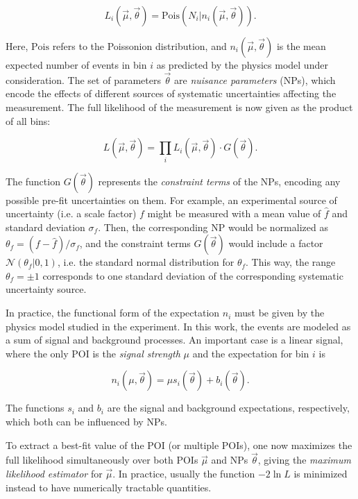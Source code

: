 \begin{equation}
    L_i (\vec{\mu}, \vec{\theta}) = \mathrm{Pois} \left(N_i | n_i (\vec{\mu}, \vec{\theta}) \right).
\end{equation}

Here, $\mathrm{Pois}$ refers to the Poissonion distribution, and $n_i (\vec{\mu}, \vec{\theta})$ is the mean expected number of events in bin $i$ as predicted by the physics model under consideration. The set of parameters $\vec{\theta}$ are \textit{nuisance parameters} (NPs), which encode the effects of different sources of systematic uncertainties affecting the measurement. The full likelihood of the measurement is now given as the product of all bins:

\begin{equation}
    L (\vec{\mu}, \vec{\theta}) = \prod_i L_i (\vec{\mu}, \vec{\theta}) \cdot G(\vec{\theta}).
\end{equation}

The function $G(\vec{\theta})$ represents the \textit{constraint terms} of the NPs, encoding any possible pre-fit uncertainties on them. For example, an experimental source of uncertainty (i.e. a scale factor) $f$ might be measured with a mean value of $\hat{f}$ and standard deviation $\sigma_f$. Then, the corresponding NP would be normalized as $\theta_f = (f-\hat{f})/\sigma_f$, and the constraint terms $G(\vec{\theta})$ would include a factor $\mathcal{N}(\theta_f | 0,1)$, i.e. the standard normal distribution for $\theta_f$. This way, the range $\theta_f = \pm 1$ corresponds to one standard deviation of the corresponding systematic uncertainty source.

In practice, the functional form of the expectation $n_i$ must be given by the physics model studied in the experiment. In this work, the events are modeled as a sum of signal and background processes. An important case is a linear signal, where the only POI is the \textit{signal strength} $\mu$ and the expectation for bin $i$ is

\begin{equation}
\label{eq:methods:linearsignal}
    n_i (\mu, \vec{\theta}) = \mu s_i (\vec{\theta}) + b_i (\vec{\theta}).
\end{equation}

The functions $s_i$ and $b_i$ are the signal and background expectations, respectively, which both can be influenced by NPs. 

To extract a best-fit value of the POI (or multiple POIs), one now maximizes the full likelihood simultaneously over both POIs $\vec{\mu}$ and NPs $\vec{\theta}$, giving the \textit{maximum likelihood estimator} for $\vec{\mu}$. In practice, usually the function $-2 \ln L$ is minimized instead to have numerically tractable quantities. 

